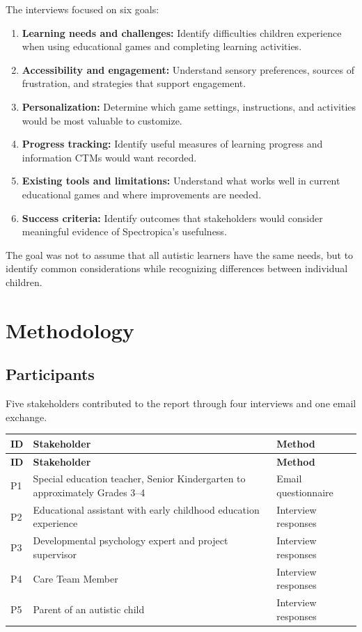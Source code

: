 \documentclass[12pt, titlepage]{article}
\begin{document}
The interviews focused on six goals:
\begin{enumerate}
\item \textbf{Learning needs and challenges:} Identify difficulties children experience when using educational games and completing learning activities.
\item \textbf{Accessibility and engagement:} Understand sensory preferences, sources of frustration, and strategies that support engagement.
\item \textbf{Personalization:} Determine which game settings, instructions, and activities would be most valuable to customize.
\item \textbf{Progress tracking:} Identify useful measures of learning progress and information CTMs would want recorded.
\item \textbf{Existing tools and limitations:} Understand what works well in current educational games and where improvements are needed.
\item \textbf{Success criteria:} Identify outcomes that stakeholders would consider meaningful evidence of Spectropica's usefulness.
\end{enumerate}

The goal was not to assume that all autistic learners have the same needs, but to identify common considerations while recognizing differences between individual children.

\section{Methodology}

\subsection{Participants}

Five stakeholders contributed to the report through four interviews and one email exchange.

\begin{longtable}{|p{}|p{}|p{}|}
\hline
\textbf{ID} & \textbf{Stakeholder} & \textbf{Method} \\ \hline
\endfirsthead
\hline \textbf{ID} & \textbf{Stakeholder} & \textbf{Method} \\ \hline
\endhead
P1 & Special education teacher, Senior Kindergarten to approximately Grades 3--4 & Email questionnaire \\ \hline
P2 & Educational assistant with early childhood education experience & Interview responses \\ \hline
P3 & Developmental psychology expert and project supervisor & Interview responses \\ \hline
P4 & Care Team Member & Interview responses \\ \hline
P5 & Parent of an autistic child & Interview responses \\ \hline
\end{longtable}
\end{document}
